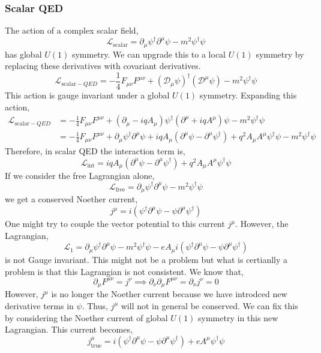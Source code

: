 \documentclass[12pt]{extarticle}
\newcommand{\lagrange}{\mathcal{L}}
\theoremstyle{definition}
\begin{document}
\subsubsection{Scalar QED}
The action of a complex scalar field,
\[ \lagrange_{\text{scalar}} = \partial_\mu \psi^\dagger \partial^\mu \psi - m^2 \psi^\dagger \psi \] 
has global $U(1)$ symmetry. We can upgrade this to a local $U(1)$ symmetry by replacing these derivatives with covariant derivatives. 
\[ \lagrange_{\text{scalar}-QED} = - \frac{1}{4} F_{\mu \nu} F^{\mu \nu} + (\mathcal{D}_\mu \psi)^\dagger (\mathcal{D}^\mu \psi) - m^2 \psi^\dagger \psi \]
This action is gauge invariant under a global $U(1)$ symmetry. Expanding this action,
\begin{align*}
\lagrange_{\text{scalar}-QED} & = - \frac{1}{4} F_{\mu \nu} F^{\mu \nu} + (\partial_\mu - i q A_\mu) \psi^\dagger (\partial^\mu + i q A^\mu) \psi - m^2 \psi^\dagger \psi
\\
& = - \frac{1}{4} F_{\mu \nu} F^{\mu \nu} + \partial_\mu \psi^\dagger \partial^\mu \psi + i q A_\mu ( \partial^\mu \psi - \partial^\mu \psi^\dagger) + q^2 A_\mu A^\mu \psi^\dagger \psi - m^2 \psi^\dagger \psi 
\end{align*}
Therefore, in scalar QED the interaction term is,
\[ \lagrange_{\text{int}} = i q A_\mu ( \partial^\mu \psi - \partial^\mu \psi^\dagger) + q^2 A_\mu A^\mu \psi^\dagger \psi \]
If we consider the free Lagrangian alone,
\[ \lagrange_{\text{free}} = \partial_\mu \psi^\dagger \partial^\mu \psi - m^2 \psi^\dagger \psi \]
we get a conserved Noether current,
\[ j^\mu = i \left( \psi^\dagger \partial^\mu \psi - \psi \partial^\mu \psi^\dagger \right) \]
One might try to couple the vector potential to this current $j^\mu$. However, the Lagrangian,
\[ \lagrange_{1} = \partial_\mu \psi^\dagger \partial^\mu \psi - m^2 \psi^\dagger \psi - e A_\mu i \left( \psi^\dagger \partial^\mu \psi - \psi \partial^\mu \psi^\dagger \right) \]
is not Gauge invariant. This might not be a problem but what is certianlly a problem is that this Lagrangian is not consistent. We know that,
\[ \partial_\mu F^{\mu \nu} = j^\nu \implies \partial_{\nu} \partial_{\mu} F^{\mu \nu} = \partial_{\nu} j^{\nu} = 0 \]
However, $j^\mu$ is no longer the Noether current because we have introdced new derivative terms in $\psi$. Thus, $j^{\mu}$ will not in general be conserved. We can fix this by considering the Noether current of global $U(1)$ symmetry in this new Lagrangian. This current becomes,
\[ j_{\text{true}}^\mu = i \left( \psi^\dagger \partial^\mu \psi - \psi \partial^\mu \psi^\dagger \right) + e A^\mu \psi^\dagger \psi \]
\end{document}
